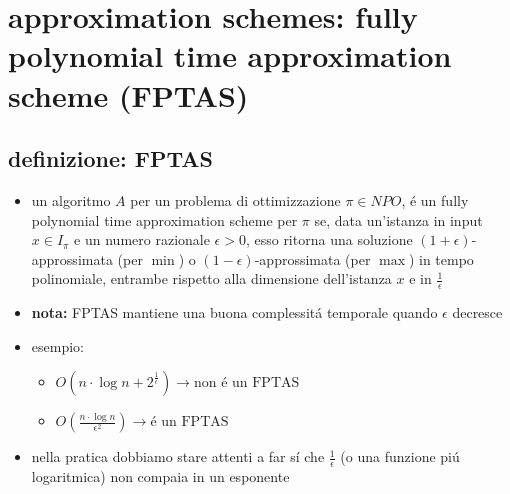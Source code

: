 \section*{approximation schemes: fully polynomial time approximation scheme (FPTAS)}


\subsection*{definizione: FPTAS}
\begin{flushleft}
	\begin{itemize}
		\item un algoritmo $A$ per un problema di ottimizzazione $\pi\in NPO$, \'e un fully polynomial time approximation scheme per $\pi$ se, data un'istanza in input $x\in I_\pi$ e un numero razionale $\epsilon>0$, esso ritorna una soluzione $(1+\epsilon)$-approssimata (per $\min$) o $(1-\epsilon)$-approssimata (per $\max$) in tempo polinomiale, entrambe rispetto alla dimensione dell'istanza $x$ e in $\frac{1}{\epsilon}$
		\item \textbf{nota:} FPTAS mantiene una buona complessit\'a temporale quando $\epsilon$ decresce
		\item esempio:
		\begin{itemize}
			\item $O(n\cdot\log n+2^\frac{1}{\epsilon})\rightarrow\text{non \'e un FPTAS}$
			\item $O(\frac{n\cdot\log n}{\epsilon^2})\rightarrow\text{\'e un FPTAS}$
		\end{itemize}
		\item nella pratica dobbiamo stare attenti a far s\'i che $\frac{1}{\epsilon}$ (o una funzione pi\'u logaritmica) non compaia in un esponente
	\end{itemize}
\end{flushleft}


